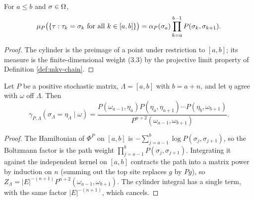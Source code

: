 \begin{theorem}
    \label{thm:mkv-chain-cylinder}
    \leanok

    For $a \le b$ and $\sigma \in \Omega$,
    \[
        \mu_P\bigl(\left\{ \tau : \tau_k = \sigma_k \text{ for all } k \in [a,b] \right\}\bigr)
          = \alpha_P(\sigma_a) \prod_{k=a}^{b-1} P(\sigma_k, \sigma_{k+1}).
    \]
\end{theorem}
\begin{proof}
    \leanok

    The cylinder is the preimage of a point under restriction to $[a,b]$; its measure is the
    finite-dimensional weight (3.3) by the projective limit property of Definition
    \ref{def:mkv-chain}.
\end{proof}

\begin{theorem}
    \label{thm:mkv-38-1-single}
    \leanok

    Let $P$ be a positive stochastic matrix, $\Lambda = [a,b]$ with $b = a + n$, and let
    $\eta$ agree with $\omega$ off $\Lambda$. Then
    \[
        \gamma_{P,\Lambda}(\sigma_\Lambda = \eta_\Lambda \mid \omega)
          = \frac{P(\omega_{a-1}, \eta_a) P(\eta_a, \eta_{a+1}) \cdots P(\eta_b, \omega_{b+1})}
                 {P^{n+2}(\omega_{a-1}, \omega_{b+1})}.
    \]
\end{theorem}
\begin{proof}
    \leanok

    The Hamiltonian of $\Phi^P$ on $[a,b]$ is $-\sum_{j=a-1}^{b} \log P(\sigma_j,\sigma_{j+1})$,
    so the Boltzmann factor is the path weight $\prod_{j=a-1}^{b} P(\sigma_j, \sigma_{j+1})$.
    Integrating it against the independent kernel on $[a,b]$ contracts the path into a matrix
    power by induction on $n$ (summing out the top site replaces $g$ by $Pg$), so
    $Z_\Lambda = |E|^{-(n+1)} P^{n+2}(\omega_{a-1}, \omega_{b+1})$. The cylinder integral has a
    single term, with the same factor $|E|^{-(n+1)}$, which cancels.
\end{proof}

